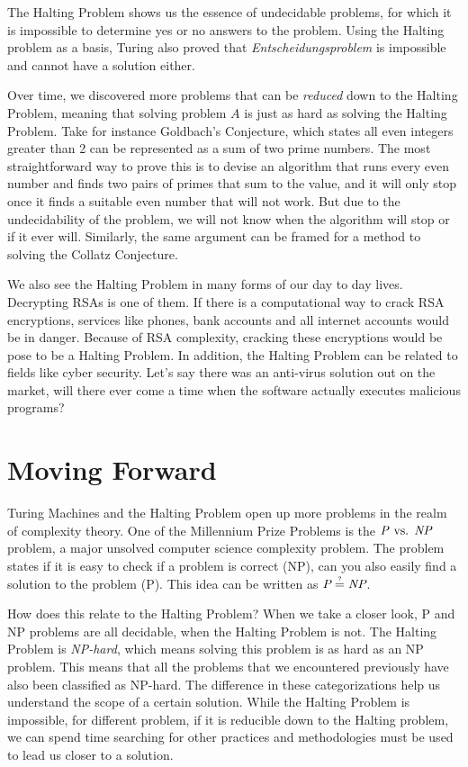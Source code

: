 \documentclass[12pt]{article}
\begin{document}
The Halting Problem shows us the essence of undecidable problems, for which it is impossible to determine yes or no answers to the problem. Using the Halting problem as a basis, Turing also proved that \textit{Entscheidungsproblem} is impossible and cannot have a solution either.

Over time, we discovered more problems that can be \textit{reduced} down to the Halting Problem, meaning that solving problem $A$ is just as hard as solving the Halting Problem. Take for instance Goldbach's Conjecture, which states all even integers greater than 2 can be represented as a sum of two prime numbers. The most straightforward way to prove this is to devise an algorithm that runs every even number and finds two pairs of primes that sum to the value, and it will only stop once it finds a suitable even number that will not work. But due to the undecidability of the problem, we will not know when the algorithm will stop or if it ever will. Similarly, the same argument can be framed for a method to solving the Collatz Conjecture. 

We also see the Halting Problem in many forms of our day to day lives. Decrypting RSAs is one of them. If there is a computational way to crack RSA encryptions, services like phones, bank accounts and all internet accounts would be in danger. Because of RSA complexity, cracking these encryptions would be pose to be a Halting Problem. In addition, the Halting Problem can be related to fields like cyber security. Let's say there was an anti-virus solution out on the market, will there ever come a time when the software actually executes malicious programs? 

\section{Moving Forward}

Turing Machines and the Halting Problem open up more problems in the realm of complexity theory. One of the Millennium Prize Problems is the $\text{\textit{P} vs. \textit{NP}}$ problem, a major unsolved computer science complexity problem. The problem states if it is easy to check if a problem is correct (NP), can you also easily find a solution to the problem (P). This idea can be written as $\textit{P}\stackrel{\text{\tiny ?}}{=}\textit{NP}$.

How does this relate to the Halting Problem? When we take a closer look, P and NP problems are all decidable, when the Halting Problem is not. The Halting Problem is \textit{NP-hard}, which means solving this problem is as hard as an NP problem. This means that all the problems that we encountered previously have also been classified as NP-hard. The difference in these categorizations help us understand the scope of a certain solution. While the Halting Problem is impossible, for different problem, if it is reducible down to the Halting problem, we can spend time searching for other practices and methodologies must be used to lead us closer to a solution.
\end{document}
